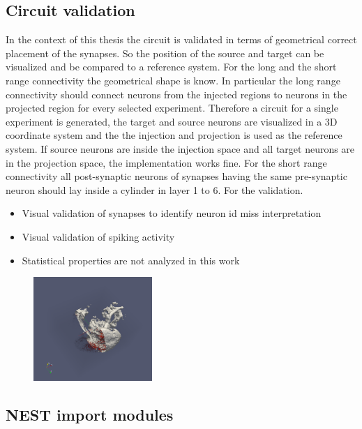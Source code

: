 \documentclass[a4paper]{article}
\begin{document}
\subsection{Circuit validation}

In the context of this thesis the circuit is validated in terms of geometrical correct placement of
the synapses. So the position of the source and target can be visualized and be compared to a 
reference system. For the long and the short range connectivity the geometrical shape is know.
In particular the long range connectivity should connect neurons from the injected regions to neurons
in the projected region for every selected experiment. Therefore a circuit for a single experiment is 
generated, the target and source neurons are visualized in a 3D coordinate system and the the injection
and projection is used as the reference system. If source neurons are inside the injection space and all
target neurons are in the projection space, the implementation works fine.
For the short range connectivity all post-synaptic neurons of synapses having the same pre-synaptic neuron should
lay inside a cylinder in layer 1 to 6. For the validation. 
 
\begin{itemize}
      \item Visual validation of synapses to identify neuron id miss interpretation
      \item Visual validation of spiking activity
      \item Statistical properties are not analyzed in this work 
\end{itemize}

\begin{figure}[ht!]
\centering
\includegraphics[width=0.4\textwidth]{paraview_ex.png}
\end{figure}

\subsection{NEST import modules}
\end{document}
